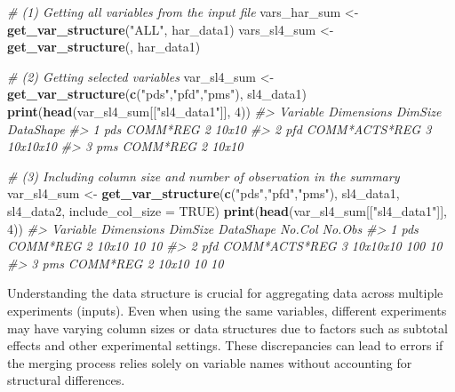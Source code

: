 \documentclass[
]{article}
\newenvironment{Shaded}{\begin{snugshade}}{\end{snugshade}}
\newcommand{\AttributeTok}[1]{\textcolor[rgb]{0.13,0.29,0.53}{#1}}
\newcommand{\CommentTok}[1]{\textcolor[rgb]{0.56,0.35,0.01}{\textit{#1}}}
\newcommand{\ConstantTok}[1]{\textcolor[rgb]{0.56,0.35,0.01}{#1}}
\newcommand{\DecValTok}[1]{\textcolor[rgb]{0.00,0.00,0.81}{#1}}
\newcommand{\FunctionTok}[1]{\textcolor[rgb]{0.13,0.29,0.53}{\textbf{#1}}}
\newcommand{\NormalTok}[1]{#1}
\newcommand{\OtherTok}[1]{\textcolor[rgb]{0.56,0.35,0.01}{#1}}
\newcommand{\StringTok}[1]{\textcolor[rgb]{0.31,0.60,0.02}{#1}}
\begin{document}
\begin{Shaded}
\begin{Highlighting}[]
\CommentTok{\# (1) Getting all variables from the input file}
\NormalTok{vars\_har\_sum }\OtherTok{\textless{}{-}} \FunctionTok{get\_var\_structure}\NormalTok{(}\StringTok{"ALL"}\NormalTok{, har\_data1)}
\NormalTok{vars\_sl4\_sum }\OtherTok{\textless{}{-}} \FunctionTok{get\_var\_structure}\NormalTok{(, har\_data1)}

\CommentTok{\# (2) Getting selected variables}
\NormalTok{var\_sl4\_sum }\OtherTok{\textless{}{-}} \FunctionTok{get\_var\_structure}\NormalTok{(}\FunctionTok{c}\NormalTok{(}\StringTok{"pds"}\NormalTok{,}\StringTok{"pfd"}\NormalTok{,}\StringTok{"pms"}\NormalTok{), sl4\_data1)}
\FunctionTok{print}\NormalTok{(}\FunctionTok{head}\NormalTok{(var\_sl4\_sum[[}\StringTok{"sl4\_data1"}\NormalTok{]], }\DecValTok{4}\NormalTok{))}
\CommentTok{\#\textgreater{}   Variable    Dimensions DimSize DataShape}
\CommentTok{\#\textgreater{} 1      pds      COMM*REG       2     10x10}
\CommentTok{\#\textgreater{} 2      pfd COMM*ACTS*REG       3  10x10x10}
\CommentTok{\#\textgreater{} 3      pms      COMM*REG       2     10x10}


\CommentTok{\# (3) Including column size and number of observation in the summary}
\NormalTok{var\_sl4\_sum }\OtherTok{\textless{}{-}} \FunctionTok{get\_var\_structure}\NormalTok{(}\FunctionTok{c}\NormalTok{(}\StringTok{"pds"}\NormalTok{,}\StringTok{"pfd"}\NormalTok{,}\StringTok{"pms"}\NormalTok{), sl4\_data1, sl4\_data2, }
                                 \AttributeTok{include\_col\_size =} \ConstantTok{TRUE}\NormalTok{)}
\FunctionTok{print}\NormalTok{(}\FunctionTok{head}\NormalTok{(var\_sl4\_sum[[}\StringTok{"sl4\_data1"}\NormalTok{]], }\DecValTok{4}\NormalTok{))}
\CommentTok{\#\textgreater{}   Variable    Dimensions DimSize DataShape No.Col No.Obs}
\CommentTok{\#\textgreater{} 1      pds      COMM*REG       2     10x10     10     10}
\CommentTok{\#\textgreater{} 2      pfd COMM*ACTS*REG       3  10x10x10    100     10}
\CommentTok{\#\textgreater{} 3      pms      COMM*REG       2     10x10     10     10}
\end{Highlighting}
\end{Shaded}

Understanding the data structure is crucial for aggregating data across
multiple experiments (inputs). Even when using the same variables,
different experiments may have varying column sizes or data structures
due to factors such as subtotal effects and other experimental settings.
These discrepancies can lead to errors if the merging process relies
solely on variable names without accounting for structural differences.
\end{document}
